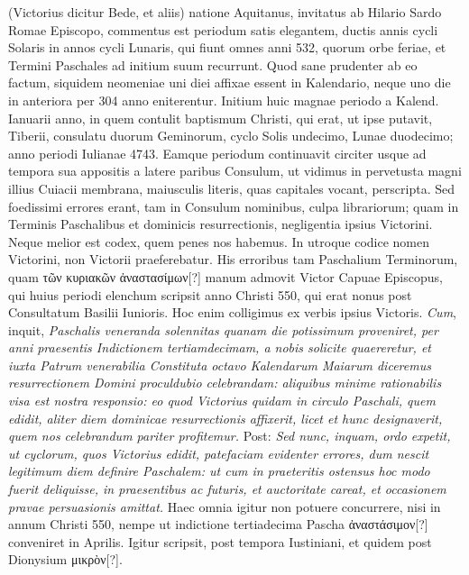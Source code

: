(Victorius dicitur Bede, et aliis) natione Aquitanus, invitatus ab
Hilario Sardo Romae Episcopo, commentus est periodum satis elegantem,
ductis annis cycli Solaris in annos cycli Lunaris, qui fiunt
omnes anni 532, quorum orbe feriae, et Termini Paschales ad initium
suum recurrunt.
Quod sane prudenter ab eo factum, siquidem
neomeniae uni diei affixae essent in Kalendario, neque uno die
in anteriora per 304 anno eniterentur.
Initium huic magnae periodo
a Kalend. Ianuarii anno, in quem contulit baptismum Christi,
qui erat, ut ipse putavit,  Tiberii, consulatu duorum Geminorum,
cyclo Solis undecimo, Lunae duodecimo; anno periodi Iulianae
4743.
Eamque periodum continuavit circiter usque ad tempora
sua appositis a latere paribus Consulum, ut vidimus in pervetusta
magni illius Cuiacii membrana, maiusculis literis, quas capitales vocant,
perscripta.
Sed foedissimi errores erant, tam in Consulum nominibus,
culpa librariorum; quam in Terminis Paschalibus et dominicis
resurrectionis, negligentia ipsius Victorini.
Neque melior est
codex, quem penes nos habemus.
In utroque codice nomen Victorini,
non Victorii praeferebatur.
His erroribus tam Paschalium
Terminorum, quam \textgreek{τῶν κυριακῶν ἀναστασίμων[?]} manum admovit Victor
Capuae Episcopus, qui huius periodi elenchum scripsit anno
Christi 550, qui erat nonus post Consultatum Basilii Iunioris.
Hoc
enim colligimus ex verbis ipsius Victoris.
\textit{Cum}, inquit, \textit{Paschalis
veneranda solennitas quanam die potissimum proveniret, per anni praesentis
Indictionem tertiamdecimam, a nobis solicite quaereretur, et
iuxta Patrum venerabilia Constituta octavo Kalendarum Maiarum
diceremus resurrectionem Domini proculdubio celebrandam: aliquibus
minime rationabilis visa est nostra responsio: eo quod Victorius quidam
in circulo Paschali, quem edidit, aliter diem dominicae resurrectionis
affixerit, licet et hunc designaverit, quem nos celebrandum pariter
profitemur.}
Post: \textit{Sed nunc, inquam, ordo expetit, ut cyclorum, quos
Victorius edidit, patefaciam evidenter errores, dum nescit legitimum
diem definire Paschalem: ut cum in praeteritis ostensus hoc modo fuerit
deliquisse, in praesentibus ac futuris, et auctoritate careat, et occasionem
pravae persuasionis amittat.}
%
Haec omnia igitur non potuere
concurrere, nisi in annum Christi 550, nempe ut indictione tertiadecima
Pascha \textgreek{ἀναστάσιμον[?]} conveniret in  Aprilis.
Igitur scripsit,
post tempora Iustiniani, et quidem post Dionysium \textgreek{μικρὸν[?]}.
